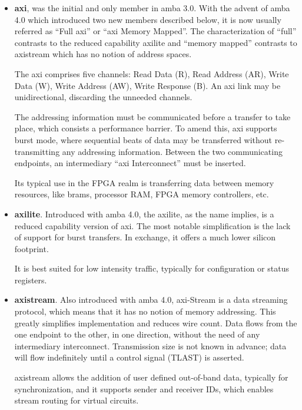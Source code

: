 \begin{itemize}
\item	\textbf{\gls{axi}}, was the initial and only member in \gls{amba} 3.0.
	With the advent of \gls{amba} 4.0 which introduced
	two new members described below, it is now usually
	referred as ``Full \gls{axi}'' or ``\gls{axi} Memory Mapped''.
	The characterization of ``full'' contrasts to
	the reduced capability \gls{axilite} and ``memory mapped''
	contrasts to \gls{axistream} which has no notion of address spaces.

	The \gls{axi} comprises five channels: Read Data (R), Read Address (AR),
	Write Data (W), Write Address (AW), Write Response (B). An \gls{axi} link
	may be unidirectional, discarding the unneeded channels.

	The addressing information must be communicated before a transfer to take place,
	which consists a performance barrier.
	To amend this, \gls{axi} supports \gls{burst} mode,
	where sequential \glspl{beat} of data may be transferred without
	re-transmitting any addressing information.
	Between the two communicating endpoints,
	an intermediary ``\gls{axi} Interconnect'' must be inserted.

	Its typical use in the FPGA realm is transferring data between memory resources,
 	like \glspl{bram}, processor RAM, FPGA memory controllers, etc.

\item	\textbf{\gls{axilite}}. Introduced with \gls{amba} 4.0,
	the \gls{axilite}, as the  name implies,
	is a reduced capability version of \gls{axi}.
	The most notable simplification is the
	lack of support for \gls{burst} transfers.
	In exchange, it offers a much lower silicon footprint.

	It is best suited for low intensity traffic,
	typically for configuration or status registers.

\item	\textbf{\gls{axistream}}. Also introduced with \gls{amba} 4.0,
	\gls{axi}-Stream is a data streaming protocol,
	which means that it has no notion of memory addressing.
	This greatly simplifies implementation and reduces wire count.
	Data flows from the one endpoint to the other, in one direction,
	without the need of any intermediary interconnect.
	Transmission size is not known in advance; data will flow
	indefinitely until a control signal (TLAST) is asserted.

	\gls{axistream} allows the addition of user defined out-of-band data,
	typically for synchronization, and it supports sender and receiver IDs,
	which enables stream routing for virtual circuits.
\end{itemize}

